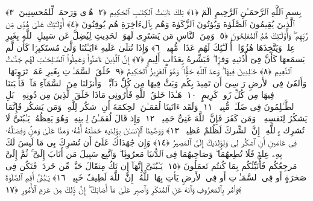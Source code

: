 
  
    
  
    
    

\nopagebreak
  بِسمِ ٱللَّهِ ٱلرَّحمَـٰنِ ٱلرَّحِيمِ
  الٓمٓ ﴿١﴾
 تِلكَ ءَايَـٰتُ ٱلكِتَـٰبِ ٱلحَكِيمِ ﴿٢﴾
 هُدًۭى وَرَحمَةًۭ لِّلمُحسِنِينَ ﴿٣﴾
 ٱلَّذِينَ يُقِيمُونَ ٱلصَّلَوٰةَ وَيُؤتُونَ ٱلزَّكَوٰةَ وَهُم بِٱلءَاخِرَةِ هُم يُوقِنُونَ ﴿٤﴾
 أُو۟لَـٰٓئِكَ عَلَىٰ هُدًۭى مِّن رَّبِّهِم ۖ وَأُو۟لَـٰٓئِكَ هُمُ ٱلمُفلِحُونَ ﴿٥﴾
 وَمِنَ ٱلنَّاسِ مَن يَشتَرِى لَهوَ ٱلحَدِيثِ لِيُضِلَّ عَن سَبِيلِ ٱللَّهِ بِغَيرِ عِلمٍۢ وَيَتَّخِذَهَا هُزُوًا ۚ أُو۟لَـٰٓئِكَ لَهُم عَذَابٌۭ مُّهِينٌۭ ﴿٦﴾
 وَإِذَا تُتلَىٰ عَلَيهِ ءَايَـٰتُنَا وَلَّىٰ مُستَكبِرًۭا كَأَن لَّم يَسمَعهَا كَأَنَّ فِىٓ أُذُنَيهِ وَقرًۭا ۖ فَبَشِّرهُ بِعَذَابٍ أَلِيمٍ ﴿٧﴾
 إِنَّ ٱلَّذِينَ ءَامَنُوا۟ وَعَمِلُوا۟ ٱلصَّـٰلِحَـٰتِ لَهُم جَنَّـٰتُ ٱلنَّعِيمِ ﴿٨﴾
 خَـٰلِدِينَ فِيهَا ۖ وَعدَ ٱللَّهِ حَقًّۭا ۚ وَهُوَ ٱلعَزِيزُ ٱلحَكِيمُ ﴿٩﴾
 خَلَقَ ٱلسَّمَـٰوَٟتِ بِغَيرِ عَمَدٍۢ تَرَونَهَا ۖ وَأَلقَىٰ فِى ٱلأَرضِ رَوَٟسِىَ أَن تَمِيدَ بِكُم وَبَثَّ فِيهَا مِن كُلِّ دَآبَّةٍۢ ۚ وَأَنزَلنَا مِنَ ٱلسَّمَآءِ مَآءًۭ فَأَنۢبَتنَا فِيهَا مِن كُلِّ زَوجٍۢ كَرِيمٍ ﴿١٠﴾
 هَـٰذَا خَلقُ ٱللَّهِ فَأَرُونِى مَاذَا خَلَقَ ٱلَّذِينَ مِن دُونِهِۦ ۚ بَلِ ٱلظَّـٰلِمُونَ فِى ضَلَـٰلٍۢ مُّبِينٍۢ ﴿١١﴾
 وَلَقَد ءَاتَينَا لُقمَـٰنَ ٱلحِكمَةَ أَنِ ٱشكُر لِلَّهِ ۚ وَمَن يَشكُر فَإِنَّمَا يَشكُرُ لِنَفسِهِۦ ۖ وَمَن كَفَرَ فَإِنَّ ٱللَّهَ غَنِىٌّ حَمِيدٌۭ ﴿١٢﴾
 وَإِذ قَالَ لُقمَـٰنُ لِٱبنِهِۦ وَهُوَ يَعِظُهُۥ يَـٰبُنَىَّ لَا تُشرِك بِٱللَّهِ ۖ إِنَّ ٱلشِّركَ لَظُلمٌ عَظِيمٌۭ ﴿١٣﴾
 وَوَصَّينَا ٱلإِنسَـٰنَ بِوَٟلِدَيهِ حَمَلَتهُ أُمُّهُۥ وَهنًا عَلَىٰ وَهنٍۢ وَفِصَـٰلُهُۥ فِى عَامَينِ أَنِ ٱشكُر لِى وَلِوَٟلِدَيكَ إِلَىَّ ٱلمَصِيرُ ﴿١٤﴾
 وَإِن جَٰهَدَاكَ عَلَىٰٓ أَن تُشرِكَ بِى مَا لَيسَ لَكَ بِهِۦ عِلمٌۭ فَلَا تُطِعهُمَا ۖ وَصَاحِبهُمَا فِى ٱلدُّنيَا مَعرُوفًۭا ۖ وَٱتَّبِع سَبِيلَ مَن أَنَابَ إِلَىَّ ۚ ثُمَّ إِلَىَّ مَرجِعُكُم فَأُنَبِّئُكُم بِمَا كُنتُم تَعمَلُونَ ﴿١٥﴾
 يَـٰبُنَىَّ إِنَّهَآ إِن تَكُ مِثقَالَ حَبَّةٍۢ مِّن خَردَلٍۢ فَتَكُن فِى صَخرَةٍ أَو فِى ٱلسَّمَـٰوَٟتِ أَو فِى ٱلأَرضِ يَأتِ بِهَا ٱللَّهُ ۚ إِنَّ ٱللَّهَ لَطِيفٌ خَبِيرٌۭ ﴿١٦﴾
 يَـٰبُنَىَّ أَقِمِ ٱلصَّلَوٰةَ وَأمُر بِٱلمَعرُوفِ وَٱنهَ عَنِ ٱلمُنكَرِ وَٱصبِر عَلَىٰ مَآ أَصَابَكَ ۖ إِنَّ ذَٟلِكَ مِن عَزمِ ٱلأُمُورِ ﴿١٧﴾
